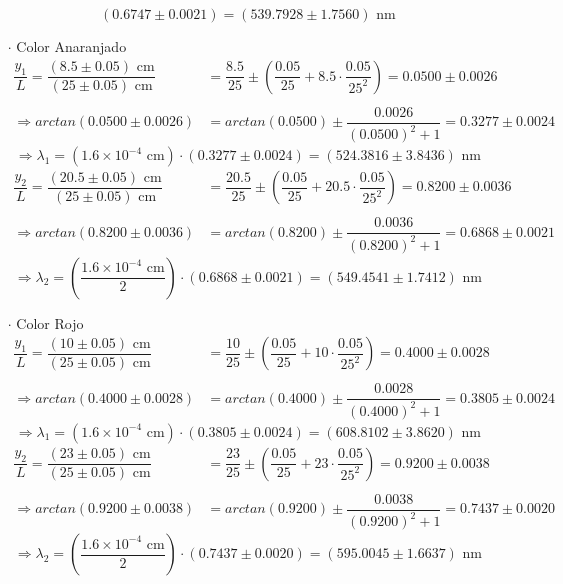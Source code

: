 \documentclass[12pt,a4paper]{article}
\begin{document}
\begin{itemize}
$$(0.6747\pm0.0021)=(539.7928\pm1.7560 )\mbox{ nm}$$
\item [$\cdot$] Color Anaranjado
\begin{align*}
\dfrac{y_1}{L}=\dfrac{(8.5\pm 0.05)\mbox{ cm}}{(25\pm 0.05)\mbox{ cm}}&=
\dfrac{8.5}{25}\pm\left(\dfrac{0.05}{25}+8.5\cdot\dfrac{0.05}{25^2}\right)=
0.0500\pm0.0026 \\\\
\Longrightarrow arctan(0.0500\pm0.0026 )&=
arctan(0.0500)\pm\dfrac{0.0026}{(0.0500)^2+1}=
0.3277\pm 0.0024
\end{align*}
$$\Longrightarrow \lambda_1=
(1.6\times 10^{-4}\mbox{ cm})\cdot
(0.3277\pm 0.0024 )=(524.3816\pm3.8436 )\mbox{ nm}$$
\begin{align*}
\dfrac{y_2}{L}=\dfrac{(20.5\pm 0.05)\mbox{ cm}}{(25\pm 0.05)\mbox{ cm}}&=
\dfrac{20.5}{25}\pm\left(\dfrac{0.05}{25}+20.5\cdot\dfrac{0.05}{25^2}\right)=
0.8200\pm0.0036 \\\\
\Longrightarrow arctan(0.8200\pm0.0036)&=
arctan(0.8200)\pm\dfrac{0.0036}{(0.8200)^2+1}=
0.6868\pm 0.0021
\end{align*}
$$\Longrightarrow \lambda_2=
\left(\dfrac{1.6\times 10^{-4}\mbox{ cm}}{2}\right)\cdot
(0.6868\pm 0.0021 )=(549.4541\pm 1.7412 )\mbox{ nm}$$
\item [$\cdot$] Color Rojo
\begin{align*}
\dfrac{y_1}{L}=\dfrac{(10\pm 0.05)\mbox{ cm}}{(25\pm 0.05)\mbox{ cm}}&=
\dfrac{10}{25}\pm\left(\dfrac{0.05}{25}+10\cdot\dfrac{0.05}{25^2}\right)=
0.4000\pm0.0028 \\\\
\Longrightarrow arctan(0.4000\pm0.0028)&=
arctan(0.4000)\pm\dfrac{0.0028}{(0.4000)^2+1}=
0.3805\pm0.0024 
\end{align*}
$$\Longrightarrow \lambda_1=
(1.6\times 10^{-4}\mbox{ cm})\cdot
(0.3805\pm0.0024 )=(608.8102\pm3.8620 )\mbox{ nm}$$
\begin{align*}
\dfrac{y_2}{L}=\dfrac{(23\pm 0.05)\mbox{ cm}}{(25\pm 0.05)\mbox{ cm}}&=
\dfrac{23}{25}\pm\left(\dfrac{0.05}{25}+23\cdot\dfrac{0.05}{25^2}\right)=
0.9200\pm0.0038 \\\\
\Longrightarrow arctan(0.9200\pm0.0038)&=
arctan(0.9200)\pm\dfrac{0.0038}{(0.9200)^2+1}=
0.7437\pm 0.0020
\end{align*}
$$\Longrightarrow \lambda_2=
\left(\dfrac{1.6\times 10^{-4}\mbox{ cm}}{2}\right)\cdot
(0.7437\pm 0.0020 )=(595.0045\pm1.6637 )\mbox{ nm}$$
\end{itemize}
\end{document}
